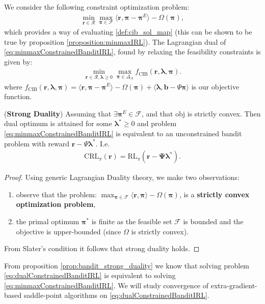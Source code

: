 We consider the following constraint optimization problem:
\begin{equation}
    \label{eq:minmaxConstrainedBanditIRL}
    \begin{aligned}
        \min_{\bm{r}\in\mathcal{R}}\max_{\bm{\pi}\in\mathcal{F}} \langle \bm{r}, \bm{\pi}-\bm{\pi}^E \rangle-\Omega(\bm{\pi}),
    \end{aligned}
\end{equation}
which provides a way of evaluating \ref{def:cib_sol_map} (this can be shown to be true by proposition \ref{proposition:minmaxIRL}). The Lagrangian dual of \ref{eq:minmaxConstrainedBanditIRL}, found by relaxing the feasibility constraints is given by:
\begin{equation}
    \label{eq:dualConstrainedBanditIRL}
    \begin{aligned}
        \min_{\bm{r}\in\mathcal{R},\bm{\lambda} \geq 0}\max_{\bm{\pi}\in\Delta_{A}} f_\text{CIB}(\bm{r},\bm{\lambda},\bm{\pi}).
    \end{aligned}
\end{equation}
where $f_\text{CIB}(\bm{r},\bm{\lambda},\bm{\pi}) = \langle \bm{r}, \bm{\pi}-\bm{\pi}^E \rangle -\Omega(\bm{\pi}) + \langle \bm{\lambda}, \bm{b}-\Psi \bm{\pi}\rangle$ is our objective function.
\begin{proposition}
    \label{prop:bandit_strong_duality}
    (\textbf{Strong Duality}) Assuming that $\exists \bm{\pi}^E\in\mathcal{F}$, and that $\text{obj}$ is strictly convex. Then dual optimum is attained for some $\bm{\lambda}^* \geq 0$ and problem \ref{eq:minmaxConstrainedBanditIRL} is equivalent to an unconstrained bandit problem with reward $\bm{r}-\Psi \bm{\lambda}^*$. I.e. 
    \begin{align*}
        \text{CRL}_\pi(\bm{r}) = \text{RL}_\pi(\bm{r} - \bm{\Psi} \bm{\lambda}^*).
    \end{align*}
\end{proposition}
\begin{proof}
    Using generic Lagrangian Duality theory, we make two observations:
    \begin{enumerate}
        \item observe that the problem: $\max_{\bm{\pi} \in \mathcal{F}} \langle \bm{r}, \bm{\pi} \rangle - \Omega(\bm{\pi})$, is a \textbf{strictly convex optimization problem},
        \item the primal optimum $\bm{\pi}^*$ is finite as the feasible set $\mathcal{F}$ is bounded and the objective is upper-bounded (since $\Omega$ is strictly convex).
    \end{enumerate}
    From Slater's condition it follows that strong duality holds.
\end{proof}
\noindent
From proposition \ref{prop:bandit_strong_duality} we know that solving problem \ref{eq:dualConstrainedBanditIRL} is equivalent to solving \ref{eq:minmaxConstrainedBanditIRL}. We will study convergence of extra-gradient-based saddle-point algorithms on \ref{eq:dualConstrainedBanditIRL}. \\%


